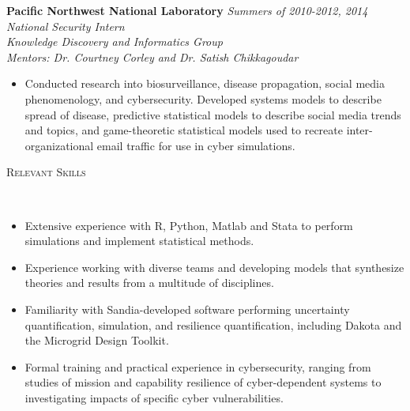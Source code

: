 \documentclass[11pt]{article}
\newenvironment{changemargin}[2]{%
  \begin{list}{}{%
    \setlength{\topsep}{0pt}%
    \setlength{\leftmargin}{#1}%
    \setlength{\rightmargin}{#2}%
    \setlength{\listparindent}{\parindent}%
    \setlength{\itemindent}{\parindent}%
    \setlength{\parsep}{\parskip}%
  }%
  \item[]}{\end{list}
}
\newcommand{\lineover}{
	\begin{changemargin}{-0.05in}{-0.05in}
		\vspace*{-8pt}
		\hrulefill \\
		\vspace*{-2pt}
	\end{changemargin}
}
\newcommand{\header}[1]{
	\begin{changemargin}{-0.5in}{-0.5in}
		\scshape{#1}\\
	\vspace*{-5pt}
  	\lineover
	\end{changemargin}
}
\newenvironment{body} {
	\vspace*{-16pt}
	\begin{changemargin}{-0.25in}{-0.5in}
  }	
	{\end{changemargin}
}
\begin{document}
\begin{body}
	\textbf{Pacific Northwest National Laboratory}  \hfill \emph{Summers of 2010-2012, 2014}\\
	\emph{National Security Intern}\\ 
	\emph{Knowledge Discovery and Informatics Group}\\
	\emph{Mentors: Dr. Courtney Corley and Dr. Satish Chikkagoudar}
	\vspace*{-4pt}
	\begin{itemize}	
		\item Conducted research into biosurveillance, disease propagation, social media phenomenology, and cybersecurity. Developed systems models to describe spread of disease, predictive statistical models to describe social media trends and topics, and game-theoretic statistical models used to recreate inter-organizational email traffic for use in cyber simulations.
	\end{itemize}
				
\end{body}

\pagebreak

\smallskip
\header{Relevant Skills}
\begin{body}
	\vspace{14pt}
	\begin{itemize}
		\item Extensive experience with R, Python, Matlab and Stata to perform simulations and implement statistical methods.
		\item Experience working with diverse teams and developing models that synthesize theories and results from a multitude of disciplines.
		\item Familiarity with Sandia-developed software performing uncertainty quantification, simulation, and resilience quantification, including Dakota and the Microgrid Design Toolkit.
		\item Formal training and practical experience in cybersecurity, ranging from studies of mission and capability resilience of cyber-dependent systems to investigating impacts of specific cyber vulnerabilities.
	\end{itemize}
\end{body}
\end{document}
